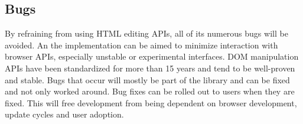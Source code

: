 \subsection{Bugs} %

By refraining from using HTML editing APIs, all of its numerous bugs will be avoided. An the implementation can be aimed to minimize interaction with browser APIs, especially unstable or experimental interfaces. DOM manipulation APIs have been standardized for more than 15 years and tend to be well-proven and stable. Bugs that occur will mostly be part of the library and can be fixed and not only worked around. Bug fixes can be rolled out to users when they are fixed. This will free development from being dependent on browser development, update cycles and user adoption. 






